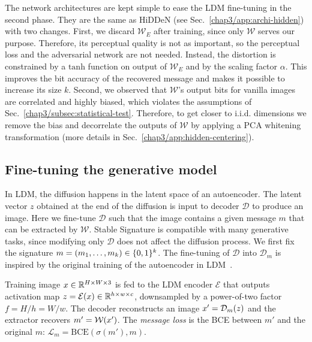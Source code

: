 The network architectures are kept simple to ease the LDM fine-tuning in the second phase.
They are the same as HiDDeN (see Sec.~\ref{chap3/app:archi-hidden}) with two changes. 
First, we discard $\mathcal{W}_E$ after training, since only $\mathcal{W}$ serves our purpose. 
Therefore, its perceptual quality is not as important, so the perceptual loss and the adversarial network are not needed. 
Instead, the distortion is constrained by a $\mathrm{tanh}$ function on output of $\mathcal{W}_E$ and by the scaling factor $\alpha$.
This improves the bit accuracy of the recovered message and makes it possible to increase its size $k$.
Second, we observed that $\mathcal{W}$'s output bits for vanilla images are correlated and highly biased, which violates the assumptions of Sec.~\ref{chap3/subsec:statistical-test}. 
Therefore, to get closer to i.i.d. dimensions we remove the bias and decorrelate the outputs of $\mathcal{W}$ by applying a PCA whitening transformation (more details in Sec.~\ref{chap3/app:hidden-centering}).


\subsection{Fine-tuning the generative model}\label{chap3/subsec:finetuning}

In \Gls*{LDM}, the diffusion happens in the latent space of an autoencoder.
The latent vector $z$ obtained at the end of the diffusion is input to decoder $\mathcal{D}$ to produce an image.
Here we fine-tune $\mathcal{D}$ such that the image contains a given message $m$ that can be extracted by $\mathcal{W}$.
Stable Signature is compatible with many generative tasks, since modifying only $\mathcal{D}$ does not affect the diffusion process.
We first fix the signature $m=(m_1,\ldots, m_k) \in \{0,1\}^k$. 
The fine-tuning of $\mathcal{D}$ into $\mathcal{D}_m$ is inspired by the original training of the autoencoder in LDM~\citep{rombach2022high}.

Training image $x \in \mathbb{R}^{H\times W\times 3}$ is fed to the LDM encoder $\mathcal{E}$ 
that outputs activation map $z = \mathcal{E}(x) \in \mathbb{R}^{h\times w\times c}$, downsampled by a power-of-two factor $f = H/h = W/w $.
The decoder reconstructs an image $x' = \mathcal{D}_m(z)$ and the extractor recovers $m' = \mathcal{W} (x')$.
The \emph{message loss} is the BCE between $m'$ and the original $m$: $\mathcal{L}_m = \mathrm{BCE}(\sigma \left( m' \right), m)$.

